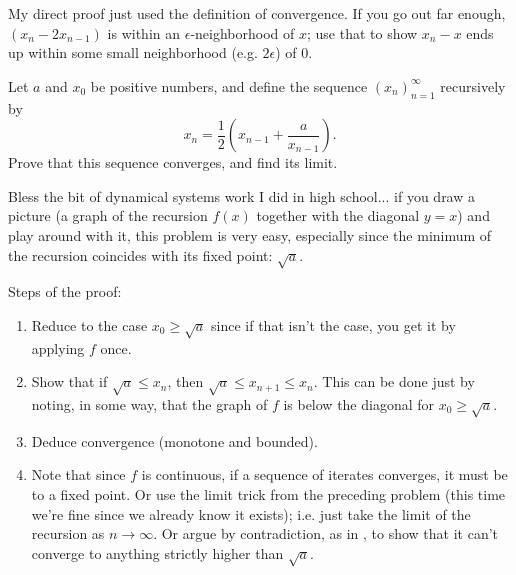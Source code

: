 \begin{solution}[2]
	My direct proof just used the definition of convergence. If you go out far enough, $(x_n - 2x_{n-1})$ is within an $\epsilon$-neighborhood of $x$; use that to show $x_n - x$ ends up within some small neighborhood (e.g. $2\epsilon$) of $0$.
\end{solution}

\begin{problem}
	Let $a$ and $x_0$ be positive numbers, and define the sequence $(x_n)_{n=1}^\infty$ recursively by
	\[
		x_n = \frac{1}{2}\left( x_{n-1} + \frac{a}{x_{n-1}}\right).
	\]
	Prove that this sequence converges, and find its limit.
\end{problem}
\begin{solution}
	Bless the bit of dynamical systems work I did in high school... if you draw a picture (a graph of the recursion $f(x)$ together with the diagonal $y=x$) and play around with it, this problem is very easy, especially since the minimum of the recursion coincides with its fixed point: $\sqrt{a}$.
	
	Steps of the proof:
	\begin{enumerate}
		\item Reduce to the case $x_0 \geq \sqrt{a}$ since if that isn't the case, you get it by applying $f$ once.
		\item Show that if $\sqrt{a} \leq x_n$, then $\sqrt{a} \leq x_{n+1} \leq x_n$. This can be done just by noting, in some way, that the graph of $f$ is below the diagonal for $x_0 \geq \sqrt{a}$.
		\item Deduce convergence (monotone and bounded).
		\item Note that since $f$ is continuous, if a sequence of iterates converges, it must be to a fixed point. Or use the limit trick from the preceding problem (this time we're fine since we already know it exists); i.e. just take the limit of the recursion as $n\to \infty$. Or argue by contradiction, as in , to show that it can't converge to anything strictly higher than $\sqrt{a}$.
	\end{enumerate}
\end{solution}

